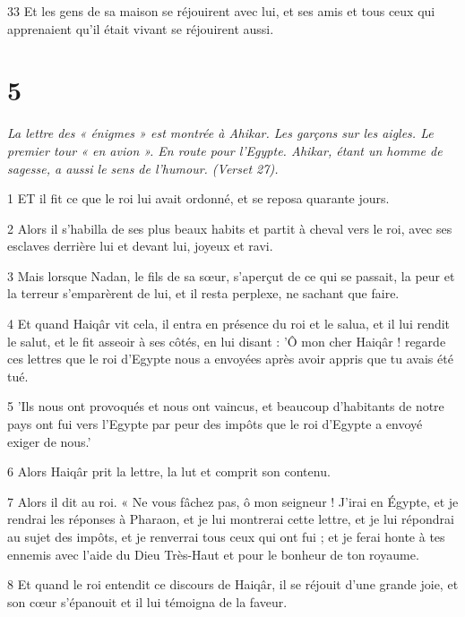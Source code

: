 \par 33 Et les gens de sa maison se réjouirent avec lui, et ses amis et tous ceux qui apprenaient qu'il était vivant se réjouirent aussi.

\chapter{5}

\par \textit{La lettre des « énigmes » est montrée à Ahikar. Les garçons sur les aigles. Le premier tour « en avion ». En route pour l'Egypte. Ahikar, étant un homme de sagesse, a aussi le sens de l'humour. (Verset 27).}

\par 1 ET il fit ce que le roi lui avait ordonné, et se reposa quarante jours.

\par 2 Alors il s'habilla de ses plus beaux habits et partit à cheval vers le roi, avec ses esclaves derrière lui et devant lui, joyeux et ravi.

\par 3 Mais lorsque Nadan, le fils de sa sœur, s'aperçut de ce qui se passait, la peur et la terreur s'emparèrent de lui, et il resta perplexe, ne sachant que faire.

\par 4 Et quand Haiqâr vit cela, il entra en présence du roi et le salua, et il lui rendit le salut, et le fit asseoir à ses côtés, en lui disant : 'Ô mon cher Haiqâr ! regarde ces lettres que le roi d'Egypte nous a envoyées après avoir appris que tu avais été tué.

\par 5 'Ils nous ont provoqués et nous ont vaincus, et beaucoup d'habitants de notre pays ont fui vers l'Egypte par peur des impôts que le roi d'Egypte a envoyé exiger de nous.'

\par 6 Alors Haiqâr prit la lettre, la lut et comprit son contenu.

\par 7 Alors il dit au roi. « Ne vous fâchez pas, ô mon seigneur ! J'irai en Égypte, et je rendrai les réponses à Pharaon, et je lui montrerai cette lettre, et je lui répondrai au sujet des impôts, et je renverrai tous ceux qui ont fui ; et je ferai honte à tes ennemis avec l'aide du Dieu Très-Haut et pour le bonheur de ton royaume.

\par 8 Et quand le roi entendit ce discours de Haiqâr, il se réjouit d'une grande joie, et son cœur s'épanouit et il lui témoigna de la faveur.

